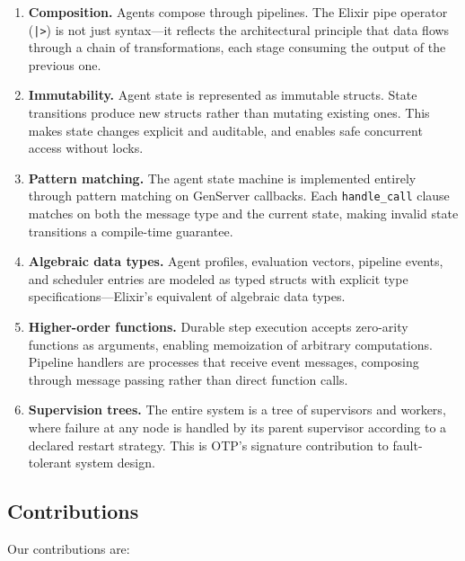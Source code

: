 \documentclass[12pt,a4paper]{article}
\theoremstyle{definition}
\theoremstyle{remark}
\begin{document}
\begin{enumerate}[leftmargin=2em]
  \item \textbf{Composition.} Agents compose through pipelines. The Elixir pipe operator (\texttt{|>}) is not just syntax---it reflects the architectural principle that data flows through a chain of transformations, each stage consuming the output of the previous one.
  \item \textbf{Immutability.} Agent state is represented as immutable structs. State transitions produce new structs rather than mutating existing ones. This makes state changes explicit and auditable, and enables safe concurrent access without locks.
  \item \textbf{Pattern matching.} The agent state machine is implemented entirely through pattern matching on GenServer callbacks. Each \texttt{handle\_call} clause matches on both the message type and the current state, making invalid state transitions a compile-time guarantee.
  \item \textbf{Algebraic data types.} Agent profiles, evaluation vectors, pipeline events, and scheduler entries are modeled as typed structs with explicit type specifications---Elixir's equivalent of algebraic data types.
  \item \textbf{Higher-order functions.} Durable step execution accepts zero-arity functions as arguments, enabling memoization of arbitrary computations. Pipeline handlers are processes that receive event messages, composing through message passing rather than direct function calls.
  \item \textbf{Supervision trees.} The entire system is a tree of supervisors and workers, where failure at any node is handled by its parent supervisor according to a declared restart strategy. This is OTP's signature contribution to fault-tolerant system design.
\end{enumerate}

\subsection{Contributions}

Our contributions are:
\end{document}
